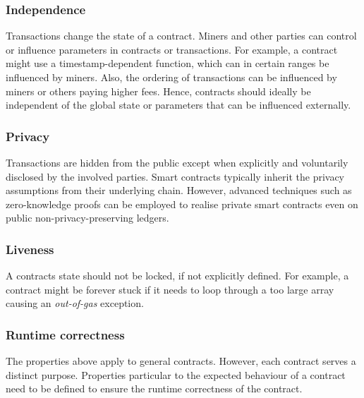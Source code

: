 \subsubsection{Independence}
Transactions change the state of a contract. Miners and other parties can control or influence parameters in contracts or transactions. For example, a contract might use a timestamp-dependent function, which can in certain ranges be influenced by miners. Also, the ordering of transactions can be influenced by miners or others paying higher fees. Hence, contracts should ideally be independent of the global state or parameters that can be influenced externally.

\subsubsection{Privacy}
Transactions are hidden from the public except when explicitly and voluntarily disclosed by the involved parties.
Smart contracts typically inherit the privacy assumptions from their underlying chain.
However, advanced techniques such as zero-knowledge proofs can be employed to realise private smart contracts even on public non-privacy-preserving ledgers.

\subsubsection{Liveness}
A contracts state should not be locked, if not explicitly defined.
For example, a contract might be forever stuck if it needs to loop through a too large array causing an \emph{out-of-gas} exception.


\subsubsection{Runtime correctness}
The properties above apply to general contracts. However, each contract serves a distinct purpose. Properties particular to the expected behaviour of a contract need to be defined to ensure the runtime correctness of the contract.

%


